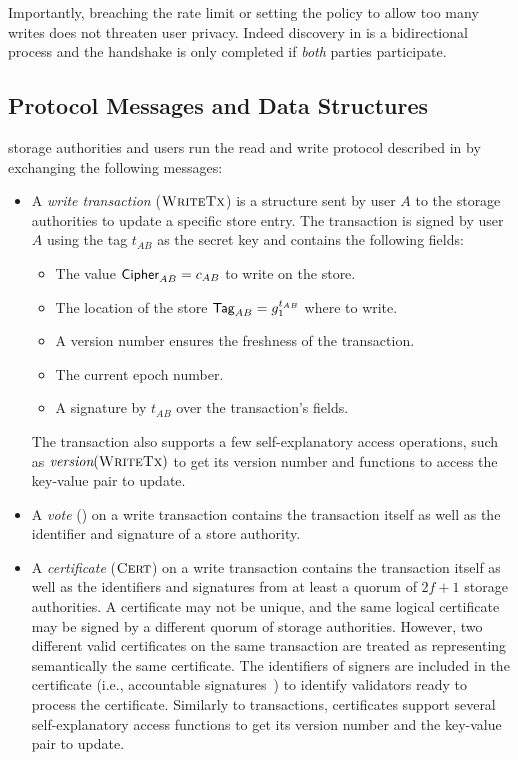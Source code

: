 Importantly, breaching the rate limit or setting the policy to allow too many writes does not threaten user privacy. Indeed discovery in \sys is a bidirectional process and the handshake is only completed if \textit{both} parties participate.
~\cite{camenisch2006how,davidson2018privacy}

\subsection{Protocol Messages and Data Structures} \label{sec:protocol-messages}
\sysname storage authorities and users run the read and write protocol described in  by exchanging the following messages:
\begin{itemize}
    \item A \emph{write transaction} ($\textsc{WriteTx}$) is a structure sent by user $A$ to the storage authorities to update a specific store entry. The transaction is signed by user $A$ using the tag $t_{AB}$ as the secret key and contains the following fields:
          \begin{itemize}
              \item The value $\textsf{Cipher}_{AB} = c_{AB}$ to write on the store.
              \item The location of the store $\textsf{Tag}_{AB} = g_1^{t_{AB}}$ where to write.
              \item A version number ensures the freshness of the transaction.
              \item The current epoch number.
              \item A signature by $t_{AB}$ over the transaction's fields.
          \end{itemize}
          The transaction also supports a few self-explanatory access operations, such as $\emph{version}(\textsc{WriteTx})$ to get its version number and functions to access the key-value pair to update.

    \item A \emph{vote} (\vote) on a write transaction contains the transaction itself as well as the identifier and signature of a store authority.

    \item A \emph{certificate} ($\textsc{Cert}$) on a write transaction contains the transaction itself as well as the identifiers and signatures from at least a quorum of $2f+1$ storage authorities. A certificate may not be unique, and the same logical certificate may be signed by a different quorum of storage authorities. However, two different valid certificates on the same transaction are treated as representing semantically the same certificate. The identifiers of signers are included in the certificate (i.e., accountable signatures~\cite{boneh2018compact}) to identify validators ready to process the certificate. Similarly to transactions, certificates support several self-explanatory access functions to get its version number and the key-value pair to update.


\end{itemize}
